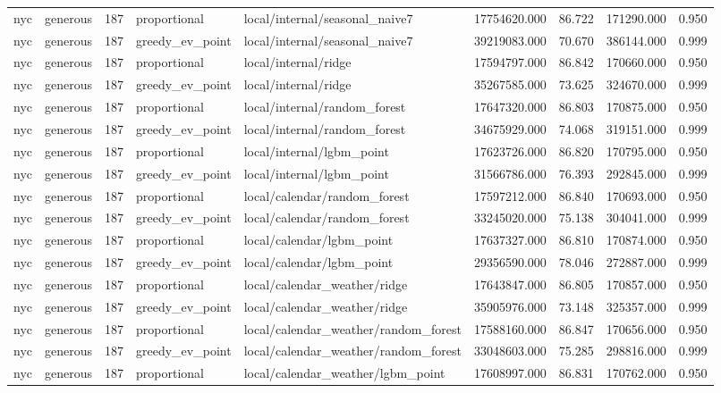 \begin{tabular}{llrllrrrr}
nyc & generous & 187 & proportional & local/internal/seasonal\_naive7 & 17754620.000 & 86.722 & 171290.000 & 0.950 \\
nyc & generous & 187 & greedy\_ev\_point & local/internal/seasonal\_naive7 & 39219083.000 & 70.670 & 386144.000 & 0.999 \\
nyc & generous & 187 & proportional & local/internal/ridge & 17594797.000 & 86.842 & 170660.000 & 0.950 \\
nyc & generous & 187 & greedy\_ev\_point & local/internal/ridge & 35267585.000 & 73.625 & 324670.000 & 0.999 \\
nyc & generous & 187 & proportional & local/internal/random\_forest & 17647320.000 & 86.803 & 170875.000 & 0.950 \\
nyc & generous & 187 & greedy\_ev\_point & local/internal/random\_forest & 34675929.000 & 74.068 & 319151.000 & 0.999 \\
nyc & generous & 187 & proportional & local/internal/lgbm\_point & 17623726.000 & 86.820 & 170795.000 & 0.950 \\
nyc & generous & 187 & greedy\_ev\_point & local/internal/lgbm\_point & 31566786.000 & 76.393 & 292845.000 & 0.999 \\
nyc & generous & 187 & proportional & local/calendar/random\_forest & 17597212.000 & 86.840 & 170693.000 & 0.950 \\
nyc & generous & 187 & greedy\_ev\_point & local/calendar/random\_forest & 33245020.000 & 75.138 & 304041.000 & 0.999 \\
nyc & generous & 187 & proportional & local/calendar/lgbm\_point & 17637327.000 & 86.810 & 170874.000 & 0.950 \\
nyc & generous & 187 & greedy\_ev\_point & local/calendar/lgbm\_point & 29356590.000 & 78.046 & 272887.000 & 0.999 \\
nyc & generous & 187 & proportional & local/calendar\_weather/ridge & 17643847.000 & 86.805 & 170857.000 & 0.950 \\
nyc & generous & 187 & greedy\_ev\_point & local/calendar\_weather/ridge & 35905976.000 & 73.148 & 325357.000 & 0.999 \\
nyc & generous & 187 & proportional & local/calendar\_weather/random\_forest & 17588160.000 & 86.847 & 170656.000 & 0.950 \\
nyc & generous & 187 & greedy\_ev\_point & local/calendar\_weather/random\_forest & 33048603.000 & 75.285 & 298816.000 & 0.999 \\
nyc & generous & 187 & proportional & local/calendar\_weather/lgbm\_point & 17608997.000 & 86.831 & 170762.000 & 0.950 \\

\end{tabular}
